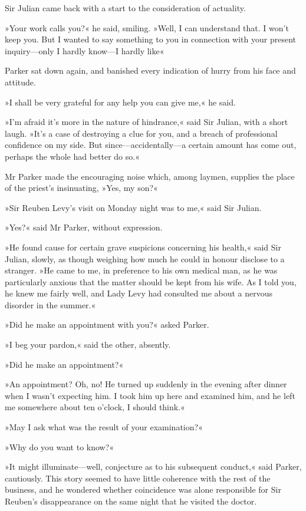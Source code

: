 Sir Julian came back with a start to the consideration of actuality.

»Your work calls you?« he said, smiling. »Well, I can understand that. I won't keep you. But I wanted to say something to you in connection with your present inquiry—only I hardly know—I hardly like\longdash«

Parker sat down again, and banished every indication of hurry from his face and attitude.

»I shall be very grateful for any help you can give me,« he said.

»I'm afraid it's more in the nature of hindrance,« said Sir Julian, with a short laugh. »It's a case of destroying a clue for you, and a breach of professional confidence on my side. But since—accidentally---a certain amount has come out, perhaps the whole had better do so.«

Mr Parker made the encouraging noise which, among laymen, supplies the place of the priest's insinuating, »Yes, my son?«

»Sir Reuben Levy's visit on Monday night was to me,« said Sir Julian.

»Yes?« said Mr Parker, without expression.

»He found cause for certain grave suspicions concerning his health,« said Sir Julian, slowly, as though weighing how much he could in honour disclose to a stranger. »He came to me, in preference to his own medical man, as he was particularly anxious that the matter should be kept from his wife. As I told you, he knew me fairly well, and Lady Levy had consulted me about a nervous disorder in the summer.«

»Did he make an appointment with you?« asked Parker.

»I beg your pardon,« said the other, absently.

»Did he make an appointment?«

»An appointment? Oh, no! He turned up suddenly in the evening after dinner when I wasn't expecting him. I took him up here and examined him, and he left me somewhere about ten o'clock, I should think.«

»May I ask what was the result of your examination?«

»Why do you want to know?«

»It might illuminate—well, conjecture as to his subsequent conduct,« said Parker, cautiously. This story seemed to have little coherence with the rest of the business, and he wondered whether coincidence was alone responsible for Sir Reuben's disappearance on the same night that he visited the doctor.

